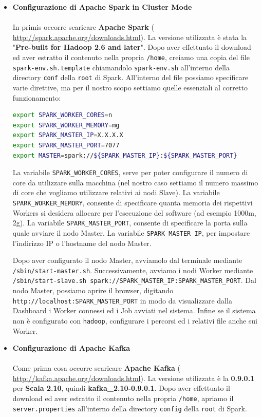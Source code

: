 \documentclass[12pt]{article}
\begin{document}
\begin{itemize}
\item {\textbf{Configurazione di Apache Spark in Cluster Mode}}\\\\
In primis occorre scaricare \textbf{Apache Spark} ( \href{http://spark.apache.org/downloads.html}{http://spark.apache.org/downloads.html}). La versione utilizzata è stata la "\textbf{Pre-built for Hadoop 2.6 and later}".
Dopo aver effettuato il download ed aver estratto il contenuto nella propria \texttt{/home}, creiamo una copia del file \texttt{spark-env.sh.template} chiamandolo \texttt{spark-env.sh} all'interno della directory \texttt{conf} della \texttt{root} di Spark. All'interno del file possiamo specificare varie direttive, ma per il nostro scopo settiamo quelle essenziali al corretto funzionamento:
\begin{lstlisting}[language=bash, caption=spark-env.sh]
export SPARK_WORKER_CORES=n
export SPARK_WORKER_MEMORY=mg
export SPARK_MASTER_IP=X.X.X.X
export SPARK_MASTER_PORT=7077
export MASTER=spark://${SPARK_MASTER_IP}:${SPARK_MASTER_PORT}
\end{lstlisting}
La variabile \texttt{SPARK\_WORKER\_CORES}, serve per poter configurare il numero di core da utilizzare sulla macchina (nel nostro caso settiamo il numero massimo di core che vogliamo utilizzare relativi ai nodi Slave).
La variabile \texttt{SPARK\_WORKER\_MEMORY}, consente di specificare quanta memoria dei rispettivi Workers si desidera allocare per l'esecuzione del software (ad esempio 1000m, 2g).
La variabile \texttt{SPARK\_MASTER\_PORT}, consente di specificare la porta sulla quale avviare il nodo Master.
La variabile \texttt{SPARK\_MASTER\_IP}, per impostare l'indirizzo IP o l'hostname del nodo Master.

Dopo aver configurato il nodo Master, avviamolo dal terminale mediante \texttt{/sbin/start-master.sh}.
Successivamente, avviamo i nodi Worker mediante \texttt{/sbin/start-slave.sh spark://SPARK\_MASTER\_IP:SPARK\_MASTER\_PORT}.
Dal nodo Master, possiamo aprire il browser, digitando \texttt{http://localhost:SPARK\_MASTER\_PORT} in modo da visualizzare dalla Dashboard i Worker connessi ed i Job avviati nel sistema.
Infine se il sistema non è configurato con \texttt{hadoop}, configurare i percorsi ed i relativi file anche sui Worker.

\item {\textbf{Configurazione di Apache Kafka}}\\\\
Come prima cosa occorre scaricare \textbf{Apache Kafka} ( \href{http://kafka.apache.org/downloads.html}{http://kafka.apache.org/downloads.html}). La versione utilizzata è la \textbf{0.9.0.1} per \textbf{Scala 2.10}, quindi \textbf{kafka\_2.10-0.9.0.1}. Dopo aver effettuato il download ed aver estratto il contenuto nella propria \texttt{/home}, apriamo il \texttt{server.properties} all'interno della directory \texttt{config} della \texttt{root} di Spark.


\end{itemize}
\end{document}
